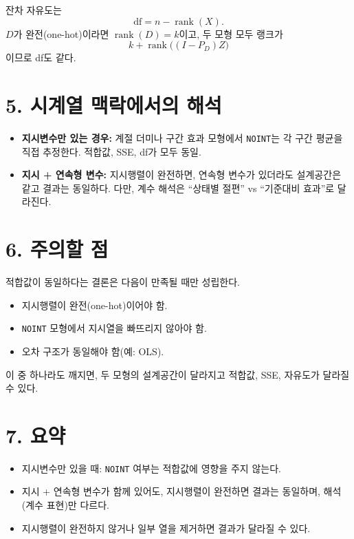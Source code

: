 \documentclass[12pt]{article}
\begin{document}
잔차 자유도는
\[
\mathrm{df} = n - \operatorname{rank}(X).
\]
$D$가 완전(one-hot)이라면 $\operatorname{rank}(D)=k$이고,
두 모형 모두 랭크가
\[
k + \operatorname{rank}\big((I - P_D)Z\big)
\]
이므로 df도 같다.

\section*{5. 시계열 맥락에서의 해석}

\begin{itemize}
\item \textbf{지시변수만 있는 경우:} 계절 더미나 구간 효과 모형에서 \texttt{NOINT}는 각 구간 평균을 직접 추정한다. 적합값, SSE, df가 모두 동일.
\item \textbf{지시 + 연속형 변수:} 지시행렬이 완전하면, 연속형 변수가 있더라도 설계공간은 같고 결과는 동일하다. 다만, 계수 해석은 ``상태별 절편'' vs ``기준대비 효과''로 달라진다.
\end{itemize}

\section*{6. 주의할 점}

적합값이 동일하다는 결론은 다음이 만족될 때만 성립한다.
\begin{itemize}
\item 지시행렬이 완전(one-hot)이어야 함.
\item \texttt{NOINT} 모형에서 지시열을 빠뜨리지 않아야 함.
\item 오차 구조가 동일해야 함(예: OLS).
\end{itemize}
이 중 하나라도 깨지면, 두 모형의 설계공간이 달라지고
적합값, SSE, 자유도가 달라질 수 있다.

\section*{7. 요약}

\begin{itemize}
\item 지시변수만 있을 때: \texttt{NOINT} 여부는 적합값에 영향을 주지 않는다.
\item 지시 + 연속형 변수가 함께 있어도, 지시행렬이 완전하면 결과는 동일하며,
      해석(계수 표현)만 다르다.
\item 지시행렬이 완전하지 않거나 일부 열을 제거하면 결과가 달라질 수 있다.
\end{itemize}
\end{document}
